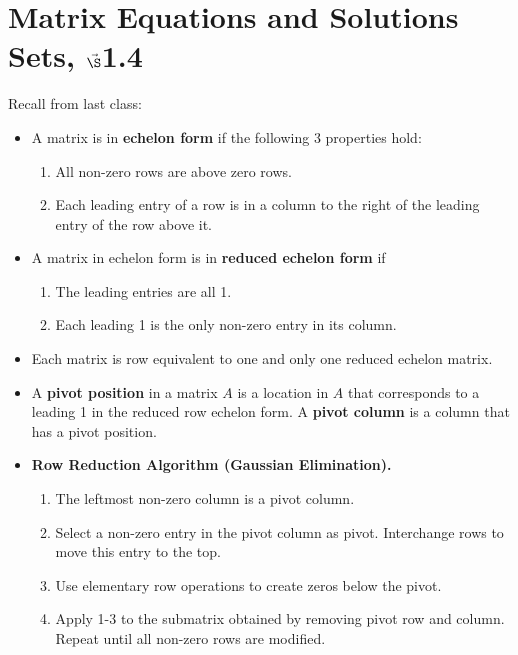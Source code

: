 


%


\section{{Matrix Equations and Solutions Sets,  $\vec\S$1.4}}%
% 

%
\thispagestyle{fancy}

Recall from last class:

\begin{itemize}

\item A matrix is in {\bf echelon form} if the following 3 properties hold:
\begin{enumerate}
\item All non-zero rows are above zero rows.
\item Each leading entry of a row is in a column to the right of the leading entry of the row above it.
\end{enumerate}
\item A matrix in echelon form is in {\bf reduced echelon form} if 
\begin{enumerate}
\item The leading entries are all 1.
\item Each leading 1 is the only non-zero entry in its column.
\end{enumerate}
\item Each matrix is row equivalent to one and only one reduced echelon matrix.
\item A {\bf pivot position} in a matrix $A$ is a location in $A$ that corresponds to a leading 1 in the reduced row echelon form. A {\bf pivot column} is a column that has a pivot position. 
\item {\bf Row Reduction Algorithm (Gaussian Elimination).}
\begin{enumerate}
\item The leftmost non-zero column is a pivot column.
\item Select a non-zero entry in the pivot column as pivot. Interchange rows to move this entry to the top.
\item Use elementary row operations to create zeros below the pivot.
\item Apply 1-3 to the submatrix obtained by removing pivot row and column. Repeat until all non-zero rows are modified.

\end{enumerate}
\end{itemize}
